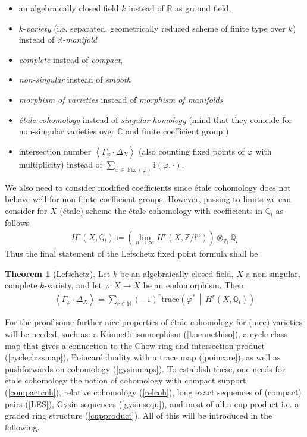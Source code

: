 \documentclass[english]{scrartcl}
\theoremstyle{definition}
\newtheorem{Thm}[Def]{Theorem}
\theoremstyle{remark}
\newcommand*{\N}{\mathds{N}}
\newcommand*{\Z}{\mathds{Z}}
\newcommand*{\Q}{\mathds{Q}}
\newcommand*{\R}{\mathds{R}}
\newcommand*{\C}{\mathds{C}}
\newcommand*{\Zmod}[1]{\Z/#1} %
\newcommand*{\Zl}{\Z_l} %
\newcommand*{\Ql}{\Q_l} %
\newcommand*{\intProd}[2]{#1\cdot#2} %
\newcommand*{\intNum}[1]{\left\langle{#1}\right\rangle} %
\newcommand*{\Graph}[1]{\Gamma_{#1}} %
\newcommand*{\Diag}[1]{\Delta_{#1}} %
\newcommand*{\trace}[2]{\text{trace}\left(#1 \,\middle|\, #2 \right)} %
\renewcommand*{\phi}{\varphi}
\begin{document}
\begin{itemize}
\item an algebraically closed field $k$ instead of $\R$ as ground field,
\item $k$-\emph{variety}
  (i.e. separated, geometrically reduced scheme of finite type over $k$)
  instead of \emph{$\R$-manifold}
\item \emph{complete} instead of \emph{compact},
\item \emph{non-singular} instead of \emph{smooth}
\item \emph{morphism of varieties} instead of \emph{morphism of manifolds}
\item \emph{étale cohomology} instead of \emph{singular homology}
  (mind that they coincide for non-singular varieties over $\C$ and
  finite coefficient group \cite[see][Thm.~21.1]{milne})
\item intersection number $\intNum{\intProd{\Graph{\phi}}{\Diag{X}}}$
  (also counting fixed points of $\phi$ with multiplicity)
  instead of $\sum_{x\in\operatorname{Fix}(\phi)}\mathrm{i}(\phi,\cdot)$.
\end{itemize}
We also need to consider modified coefficients since étale cohomology
does not behave well for non-finite coefficient groups. However,
passing to limits we can consider for $X$ (étale) scheme the étale
cohomology with coefficients in $\Ql$ as follows
\begin{gather*}
  H^r(X,\Ql)\coloneqq
  \left(\lim_{n\to\infty}H^r(X,\Zmod{l^n})\right)\otimes_{\Zl}\Ql
\end{gather*}
Thus the final statement of the Lefschetz fixed point formula shall be
\begin{Thm}[Lefschetz]
  Let $k$ be an algebraically closed field, $X$ a non-singular,
  complete $k$-variety, and let $\phi\colon X\to X$ be an
  endomorphism. Then
  \begin{gather*}
    \intNum{\intProd{\Graph{\phi}}{\Diag{X}}}
    = \sum_{r\in\N}(-1)^r\trace{\phi^*}{H^r(X,\Ql)}
  \end{gather*}
\end{Thm}
For the proof some further nice properties of étale cohomology for
(nice) varieties will be needed, such as:
a Künneth isomorphism (\autoref{kuennethiso}),
a cycle class map that gives a connection to the Chow ring and
intersection product (\autoref{cycleclassmap}),
Poincaré duality with a trace map (\autoref{poincare}),
as well as pushforwards on cohomology (\autoref{gysinmaps}).
To establish these, one needs for étale cohomology the notion of
cohomology with compact support (\autoref{compactcoh}),
relative cohomology (\autoref{relcoh}),
long exact sequences of (compact) pairs (\autoref{LES}),
Gysin sequences (\autoref{gysinsequ}),
and most of all a cup product i.e. a graded ring structure
(\autoref{cupproduct}).
All of this will be introduced in the following.
\end{document}
